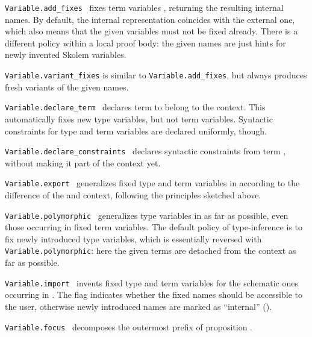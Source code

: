\begin{isabellebody}
\begin{isamarkuptext}
  \begin{description}

  \item \verb|Variable.add_fixes|~ fixes term
  variables , returning the resulting internal names.  By
  default, the internal representation coincides with the external
  one, which also means that the given variables must not be fixed
  already.  There is a different policy within a local proof body: the
  given names are just hints for newly invented Skolem variables.

  \item \verb|Variable.variant_fixes| is similar to \verb|Variable.add_fixes|, but always produces fresh variants of the given
  names.

  \item \verb|Variable.declare_term|~ declares term
   to belong to the context.  This automatically fixes new
  type variables, but not term variables.  Syntactic constraints for
  type and term variables are declared uniformly, though.

  \item \verb|Variable.declare_constraints|~ declares
  syntactic constraints from term , without making it part
  of the context yet.

  \item \verb|Variable.export|~ generalizes
  fixed type and term variables in  according to the
  difference of the  and  context,
  following the principles sketched above.

  \item \verb|Variable.polymorphic|~ generalizes type
  variables in  as far as possible, even those occurring
  in fixed term variables.  The default policy of type-inference is to
  fix newly introduced type variables, which is essentially reversed
  with \verb|Variable.polymorphic|: here the given terms are detached
  from the context as far as possible.

  \item \verb|Variable.import|~ invents fixed
  type and term variables for the schematic ones occurring in .  The  flag indicates whether the fixed names
  should be accessible to the user, otherwise newly introduced names
  are marked as ``internal'' ().

  \item \verb|Variable.focus|~ decomposes the outermost \isa{{\isasymAnd}} prefix of proposition .


\end{description}
\end{isamarkuptext}
\end{isabellebody}
